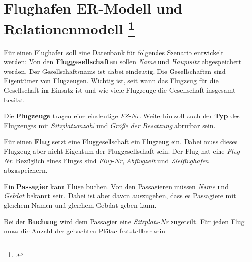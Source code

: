 \documentclass{bschlangaul-aufgabe}
\begin{document}

\section{Flughafen ER-Modell und Relationenmodell
\footcite[Aufgabe 1: Wiederholung ER-Modell und Relationenmodell]{db:ab:klausurvorbereitung}}

Für einen Flughafen soll eine Datenbank für folgendes Szenario
entwickelt werden: Von den \textbf{Fluggesellschaften} sollen
\emph{Name} und \emph{Hauptsitz} abgespeichert werden. Der
Gesellschaftsname ist dabei eindeutig. Die Gesellschaften sind
Eigentümer von Flugzeugen. Wichtig ist, seit wann das Flugzeug für die
Gesellschaft im Einsatz ist und wie viele Flugzeuge die Gesellschaft
insgesamt besitzt.

Die \textbf{Flugzeuge} tragen eine eindeutige \emph{FZ-Nr}.
Weiterhin soll auch der \textbf{Typ} des Flugzeuges mit
\emph{Sitzplatzanzahl} und \emph{Größe der Besatzung} abrufbar sein.

Für einen \textbf{Flug} setzt eine Fluggesellschaft ein Flugzeug ein.
Dabei muss dieses Flugzeug aber nicht Eigentum der Fluggesellschaft
sein. Der Flug hat eine \emph{Flug-Nr}. Bezüglich eines Fluges sind
\emph{Flug-Nr}, \emph{Abflugzeit} und \emph{Zielflughafen} abzuspeichern.

Ein \textbf{Passagier} kann Flüge buchen. Von den Passagieren müssen
\emph{Name} und \emph{Gebdat} bekannt sein. Dabei ist aber davon
auszugehen, dass es Passagiere mit gleichem Namen und gleichem
Gebdat geben kann.

Bei der \textbf{Buchung} wird dem Passagier eine \emph{Sitzplatz-Nr}
zugeteilt. Für jeden Flug muss die Anzahl der gebuchten Plätze
feststellbar sein.
\end{document}
